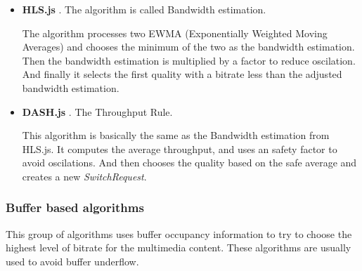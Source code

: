 \begin{itemize}
  \item \textbf{HLS.js} \cite{hls3}. The algorithm is called Bandwidth estimation. 
  
  The algorithm processes two EWMA (Exponentially Weighted Moving Averages) and chooses the minimum of the two 
  as the bandwidth estimation.
  Then the bandwidth estimation is multiplied by a factor to reduce oscilation. And finally it selects the 
  first quality with a bitrate less than the adjusted bandwidth estimation. 


  \item \textbf{DASH.js} \cite{dash3}. The Throughput Rule.
  
  This algorithm is basically the same as the Bandwidth estimation from HLS.js.
  It computes the average throughput, and uses an safety factor to avoid oscilations. And then chooses the quality
  based on the safe average and creates a new \textit{SwitchRequest}.

  
\end{itemize}

\subsubsection{Buffer based algorithms}

This group of algorithms uses buffer occupancy information to try to choose the highest level of bitrate
for the multimedia content. These algorithms are usually used to avoid buffer underflow.

